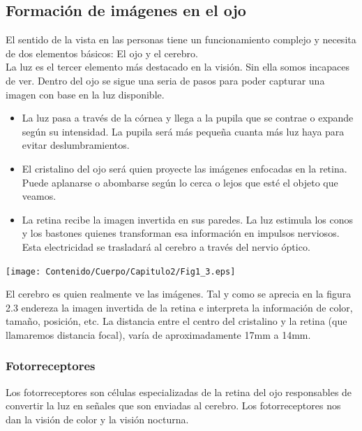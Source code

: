 \subsection{Formación de imágenes en el ojo}
El sentido de la vista en las personas tiene un funcionamiento complejo y
necesita de dos elementos básicos: El ojo y el cerebro.\\
La luz es el tercer elemento más destacado en la visión. Sin ella somos
incapaces de ver. Dentro del ojo se sigue una seria de pasos para poder capturar
una imagen con base en la luz disponible.
\begin{itemize}
	\item La luz pasa a través de la córnea y llega a la pupila que se contrae o
	      expande según su intensidad. La pupila será más pequeña cuanta más luz haya para
	      evitar deslumbramientos.
	\item El cristalino del ojo será quien proyecte las imágenes enfocadas en la retina.
	      Puede aplanarse o abombarse según lo cerca o lejos que esté el objeto que veamos.
	\item La retina recibe la imagen invertida en sus paredes. La luz estimula los
	      conos y los bastones quienes transforman esa información en impulsos nerviosos.
	      Esta electricidad se trasladará al cerebro a través del nervio óptico.
\end{itemize}
\begin{center}
	\texttt{[image: Contenido/Cuerpo/Capitulo2/Fig1\_3.eps]}
	\label{fig:MarcoTeorico:Fig3}
\end{center}
El cerebro es quien realmente ve las imágenes. Tal y como se aprecia en la figura 2.3 endereza la imagen invertida de la
retina e interpreta la información de color, tamaño, posición, etc.
La distancia entre el centro del
cristalino y la retina (que llamaremos distancia focal), varía de
aproximadamente 17mm a 14mm.\cite{Book:Jose2005}

\subsubsection{Fotorreceptores}
Los fotorreceptores son células especializadas de la retina del ojo responsables de
convertir la luz en señales que son enviadas al cerebro. Los fotorreceptores nos dan
la visión de color y la visión nocturna.\cite{WEB:American}


